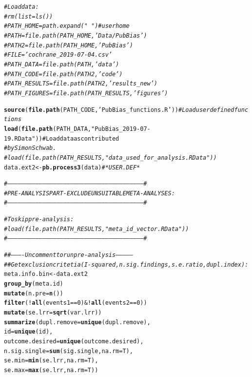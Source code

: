 \documentclass[11pt,a4paper,twoside]{book}\usepackage[]{graphicx}\usepackage[]{color}
\makeatletter
\newcommand{\hlstr}[1]{\textcolor[rgb]{0.192,0.494,0.8}{#1}}%
\newcommand{\hlcom}[1]{\textcolor[rgb]{0.678,0.584,0.686}{\textit{#1}}}%
\newcommand{\hlkwd}[1]{\textcolor[rgb]{0.737,0.353,0.396}{\textbf{#1}}}%
\newenvironment{kframe}{%
 \def\at@end@of@kframe{}%
 \ifinner\ifhmode%
  \def\at@end@of@kframe{\end{minipage}}%
  \begin{minipage}{\columnwidth}%
 \fi\fi%
 \def\FrameCommand##1{\hskip\@totalleftmargin \hskip-\fboxsep
 \colorbox{shadecolor}{##1}\hskip-\fboxsep
     \hskip-\linewidth \hskip-\@totalleftmargin \hskip\columnwidth}%
 \MakeFramed {\advance\hsize-\width
   \@totalleftmargin\z@ \linewidth\hsize
   \@setminipage}}%
 {\par\unskip\endMakeFramed%
 \at@end@of@kframe}
\newenvironment{knitrout}{}{} %
\makeatother
\begin{document}
\begin{knitrout}
\color{fgcolor}\begin{kframe}
\begin{alltt}
\hlcom{#Load data:}
\hlcom{# rm(list = ls())}
\hlcom{# PATH_HOME = path.expand("~") # user home}
\hlcom{# PATH = file.path(PATH_HOME, 'Data/PubBias')}
\hlcom{# PATH2 = file.path(PATH_HOME, 'PubBias')}
\hlcom{# FILE = 'cochrane_2019-07-04.csv'}
\hlcom{# PATH_DATA = file.path(PATH, 'data')}
\hlcom{# PATH_CODE = file.path(PATH2, 'code')}
\hlcom{# PATH_RESULTS = file.path(PATH2, 'results_new')}
\hlcom{# PATH_FIGURES = file.path(PATH_RESULTS, 'figures')}

\hlkwd{source}(\hlkwd{file.path}(PATH_CODE, \hlstr{'PubBias_functions.R'})) \hlcom{#Load user defined functions}
\hlkwd{load}(\hlkwd{file.path}(PATH_DATA, \hlstr{"PubBias_2019-07-19.RData"})) #Load data as contributed 
\hlcom{#by Simon Schwab.}
\hlcom{# load(file.path(PATH_RESULTS, "data_used_for_analysis.RData")) }
data.ext2 <- \hlkwd{pb.process3}(data) \hlcom{#*USER.DEF*}


\hlcom{#--------------------------------------------------------------------------------------------------------------------#}
\hlcom{# PRE-ANALYSIS PART - EXCLUDE UNSUITABLE META-ANALYSES:}
\hlcom{#--------------------------------------------------------------------------------------------------------------------#}

\hlcom{#To skip pre-analysis:}
\hlcom{# load(file.path(PATH_RESULTS, "meta_id_vector.RData"))}
\hlcom{#--------------------------------------------------------------------------------------------------------------------#}

\hlcom{# # ---------- Uncomment to run pre-analysis --------------}
\hlcom{# # Get exclusion critetia (I-squared, n. sig. findings, s.e. ratio, dupl.index):}
meta.info.bin <- data.ext2 %
  \hlkwd{group_by}(meta.id) %
  \hlkwd{mutate}(n.pre = \hlkwd{n}()) %
  \hlkwd{filter}(!\hlkwd{all}(events1 == 0) & !\hlkwd{all}(events2 == 0)) %
  \hlkwd{mutate}(se.lrr = \hlkwd{sqrt}(var.lrr)) %
  \hlkwd{summarize}(dupl.remove = \hlkwd{unique}(dupl.remove),
            id = \hlkwd{unique}(id),
            outcome.desired = \hlkwd{unique}(outcome.desired),
            n.sig.single = \hlkwd{sum}(sig.single, na.rm = T),
            se.min = \hlkwd{min}(se.lrr, na.rm = T),
            se.max = \hlkwd{max}(se.lrr, na.rm = T))


\end{alltt}
\end{kframe}
\end{knitrout}
\end{document}
